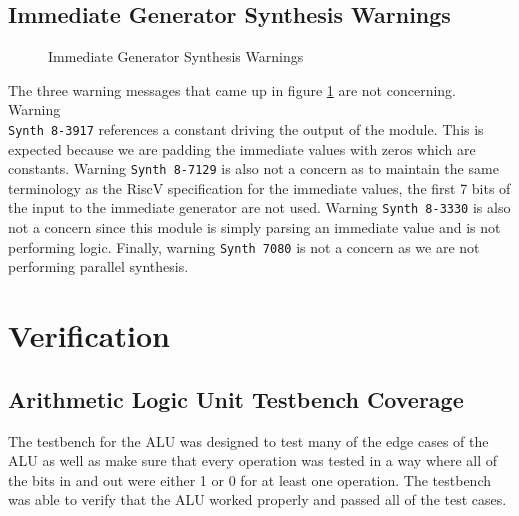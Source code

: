 \documentclass[
    a4paper, %
	12pt, %
    ]{CSSullivanBusinessReport}
\begin{document}
\begin{fullwidth}
\subsection{Immediate Generator Synthesis Warnings} %
\begin{figure}[H]
    \captionsetup{style=widetable}
    \caption{Immediate Generator Synthesis Warnings}
    \label{fig:ImmdGenSynthesisWarnings}
\end{figure}

The three warning messages that came up in figure \ref{fig:ImmdGenSynthesisWarnings} are not concerning. Warning \\\verb|Synth 8-3917| references a constant driving the output of the module. This is expected because we are padding the immediate values with zeros which are constants. Warning \verb|Synth 8-7129| is also not a concern as to maintain the same terminology as the RiscV specification for the immediate values, the first 7 bits of the input to the immediate generator are not used. Warning \verb|Synth 8-3330| is also not a concern since this module is simply parsing an immediate value and is not performing logic. Finally, warning \verb|Synth 7080| is not a concern as we are not performing parallel synthesis.  
\section{Verification} %

\subsection{Arithmetic Logic Unit Testbench Coverage} %

The testbench for the ALU was designed to test many of the edge cases of the ALU as well as make sure that every operation was tested in a way where all of the bits in and out were either 1 or 0 for at least one operation. The testbench was able to verify that the ALU worked properly and passed all of the test cases.


\end{fullwidth}
\end{document}
